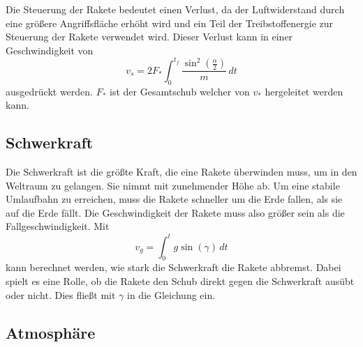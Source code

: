 Die Steuerung der Rakete bedeutet einen Verlust, da der Luftwiderstand durch eine größere Angriffsfläche erhöht wird und ein Teil der Treibstoffenergie zur Steuerung der Rakete verwendet wird. Dieser Verlust kann in einer Geschwindigkeit von
\begin{equation}
	v_s = 2F_* \int_0^{t_f} \frac{\sin^2\left(\frac{\alpha}{2}\right)}{m} \, dt
	\label{leo:raketenluftwiderstand}
\end{equation}
ausgedrückt werden.
$F_*$ ist der Gesamtschub welcher von $v_*$ hergeleitet werden kann.


\subsection{Schwerkraft}
Die Schwerkraft ist die größte Kraft, die eine Rakete überwinden muss, um in den Weltraum zu gelangen. 
Sie nimmt mit zunehmender Höhe ab. 
Um eine stabile Umlaufbahn zu erreichen, muss die Rakete schneller um die Erde fallen, als sie auf die Erde fällt. 
Die Geschwindigkeit der Rakete muss also größer sein als die Fallgeschwindigkeit. 
Mit 
\begin{equation}
	v_g =\int_0^{t} g \sin \left(\gamma\right) \, dt
	\label{leo:schwerkraftswiderstand}
\end{equation}
kann berechnet werden, wie stark die Schwerkraft die Rakete abbremst. 
Dabei spielt es eine Rolle, ob die Rakete den Schub direkt gegen die Schwerkraft ausübt oder nicht. 
Dies fließt mit $\gamma$ in die Gleichung ein.

\subsection{Atmosphäre}

